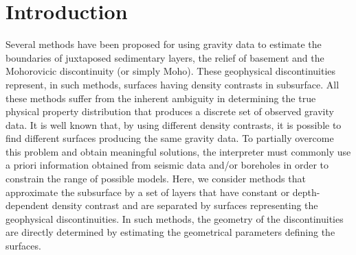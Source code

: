 \documentclass[manuscript]{geophysics}
\begin{document}
\section{Introduction}

Several methods have been proposed for using gravity data
to estimate the boundaries of juxtaposed sedimentary layers, 
the relief of basement and the Mohorovicic discontinuity (or simply Moho).
These geophysical discontinuities represent, in such methods, 
surfaces having density contrasts in subsurface.
All these methods suffer from the inherent ambiguity \citep{skeels1947, roy1962} in
determining the true physical property distribution that produces a discrete set of
observed gravity data. 
It is well known that, by using different density contrasts, 
it is possible to find different surfaces producing the same gravity data. 
To partially overcome this problem and obtain meaningful solutions, the interpreter
must commonly use a priori information obtained from seismic data and/or boreholes in
order to constrain the range of possible models.
Here, we consider methods that approximate the subsurface by a set of layers 
that have constant or depth-dependent density contrast and are separated 
by surfaces representing the geophysical discontinuities.
In such methods, the geometry of the discontinuities are directly 
determined by estimating the geometrical parameters defining the surfaces.
\end{document}

